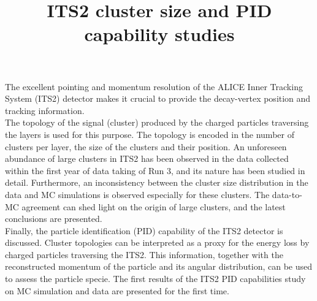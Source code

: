 \documentclass[11pt]{article}
\title{\LARGE\textbf{{ITS2 cluster size and PID capability studies}}}
\author{ }
\date{ }
\begin{document}
\maketitle

The excellent pointing and momentum resolution of the ALICE Inner Tracking System (ITS2) detector makes it crucial to provide the decay-vertex position and tracking information.\\

The topology of the signal (cluster) produced by the charged particles traversing the layers is used for this purpose. The topology is encoded in the number of clusters per layer, the size of the clusters and their position.
An unforeseen abundance of large clusters in ITS2 has been observed in the data collected within the first year of data taking of Run 3, and its nature has been studied in detail. Furthermore, an inconsistency between the cluster size distribution in the data and MC simulations is observed especially for these clusters. The data-to-MC agreement can shed light on the origin of large clusters, and the latest conclusions are presented.\\

Finally, the particle identification (PID) capability of the ITS2 detector is discussed. Cluster topologies can be interpreted as a proxy for the energy loss by charged particles traversing the ITS2. This information, together with the reconstructed momentum of the particle and its angular distribution, can be used to assess the particle specie. The first results of the ITS2 PID capabilities study on MC simulation and data are presented for the first time.
\end{document}
